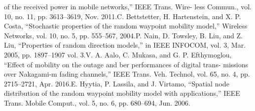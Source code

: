 \documentclass{article}
\begin{document}
of the received power in mobile networks,” IEEE Trans. Wire-
less Commun., vol. 10, no. 11, pp. 3613–3619, Nov. 2011.\newline
[12] C. Bettstetter, H. Hartenstein, and X. P. Costa, “Stochastic
properties of the random waypoint mobility model,” Wireless
Networks, vol. 10, no. 5, pp. 555–567, 2004.\newline
[13] P. Nain, D. Towsley, B. Liu, and Z. Liu, “Properties of random
direction models,” in IEEE INFOCOM, vol. 3, Mar. 2005, pp.
1897–1907 vol. 3.\newline
[14] V. A. Aalo, C. Mukasa, and G. P. Efthymoglou, “Effect of
mobility on the outage and ber performances of digital trans-
missions over Nakagami-m fading channels,” IEEE Trans. Veh.
Technol, vol. 65, no. 4, pp. 2715–2721, Apr. 2016.\newline
[15] E. Hyytia, P. Lassila, and J. Virtamo, “Spatial node distribution
of the random waypoint mobility model with applications,”
IEEE Trans. Mobile Comput., vol. 5, no. 6, pp. 680–694, Jun.
2006.\newline
%
\end{document}
